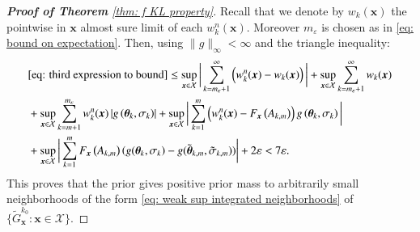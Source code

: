 \begin{proof}[\hypertarget{proof of thm KL property}{\textbf{Proof of Theorem}} \ref{thm: f KL property}]
Recall that we denote by $w_k(\boldsymbol{x})$ the pointwise in $\boldsymbol{x}$ almost sure limit of each $w_k^n(\boldsymbol{x})$. Moreover $m_{\varepsilon}$ is chosen as in \eqref{eq: bound on expectation}. Then, using $\|g\|_{\infty}<\infty $ and the triangle inequality:
$$
\begin{aligned}
&\eqref{eq: third expression to bound} \leq \sup_{\boldsymbol{x} \in \mathcal{X}}\bigg|\sum_{k=m_{\varepsilon}+1}^{\infty}\left(w_k^n(\boldsymbol{x})-w_k(\boldsymbol{x})\right)\bigg| +\sup_{\boldsymbol{x} \in \mathcal{X}} \sum_{k=m_{\varepsilon}+1}^{\infty} w_k(\boldsymbol{x}) \\
& + \sup_{\boldsymbol{x} \in \mathcal{X}} \sum_{k=m+1}^{m_{\varepsilon}} w_k^n(\boldsymbol{x})\left|g\left(\boldsymbol{\theta}_k, \sigma_k \right)\right|+\sup_{\boldsymbol{x} \in \mathcal{X}}\bigg|\sum_{k=1}^m\left(w_k^n(\boldsymbol{x})-F_{\boldsymbol{x}}\left(A_{k, m}\right)\right) g\left(\boldsymbol{\theta}_k, \sigma_k\right)\bigg| \\
&+ \sup_{\boldsymbol{x} \in \mathcal{X}}\bigg|\sum_{k=1}^m F_{\boldsymbol{x}}\left(A_{k, m}\right)\left(g(\boldsymbol{\theta}_{k}, \sigma_k\right)-g(\tilde{\boldsymbol{\theta}}_{k, m}, \tilde{\sigma}_{k, m}))\bigg|  + 2 \varepsilon < 7\varepsilon.
\end{aligned}
$$
This proves that the prior gives positive prior mass to arbitrarily small neighborhoods of the form \eqref{eq: weak sup integrated neighborhoods} of $\{\tilde{G}^{k_0}_{\boldsymbol{x}}: \boldsymbol{x} \in \mathcal{X} \}$.


\end{proof}
